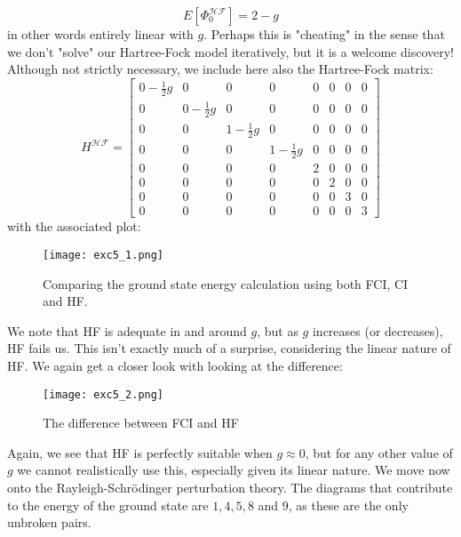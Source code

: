 \documentclass{article}
\begin{document}
\begin{equation}
    E[\Phi_0^{\mathcal{H}\mathcal{F}}] = 2 - g
\end{equation}
in other words entirely linear with $g$. Perhaps this is "cheating" in the sense that we don't "solve" our Hartree-Fock model iteratively, but it is a welcome discovery!
\newline
Although not strictly necessary, we include here also the Hartree-Fock matrix:
\begin{equation*}
H^{\mathcal{H}\mathcal{F}} =
    \begin{bmatrix}
        0 - \frac{1}{2}g & 0 & 0 & 0 & 0 & 0 & 0 & 0 \\
        0 & 0 - \frac{1}{2}g & 0 & 0 & 0 & 0 & 0 & 0 \\
        0 & 0 & 1 - \frac{1}{2}g & 0 & 0 & 0 & 0 & 0 \\
        0 & 0 & 0 & 1 - \frac{1}{2}g & 0 & 0 & 0 & 0 \\
        0 & 0 & 0 & 0 & 2 & 0 & 0 & 0 \\
        0 & 0 & 0 & 0 & 0 & 2 & 0 & 0 \\
        0 & 0 & 0 & 0 & 0 & 0 & 3 & 0 \\
        0 & 0 & 0 & 0 & 0 & 0 & 0 & 3
    \end{bmatrix}
\end{equation*}
\newline
with the associated plot:
\newpage
\begin{figure}[ht!]
    \centering
    \texttt{[image: exc5\_1.png]}
    \caption{Comparing the ground state energy calculation using both FCI, CI and HF.}
    \label{fig:enter-label}
\end{figure}
We note that HF is adequate in and around $g$, but as $g$ increases (or decreases), HF fails us. This isn't exactly much of a surprise, considering the linear nature of HF.
\newline
We again get a closer look with looking at the difference:
\begin{figure}[ht!]
    \centering
    \texttt{[image: exc5\_2.png]}
    \caption{The difference between FCI and HF}
    \label{fig:enter-label}
\end{figure}
\newline
Again, we see that HF is perfectly suitable when $g\approx 0$, but for any other value of $g$ we cannot realistically use this, especially given its linear nature.\newpage
We move now onto the Rayleigh-Schrödinger perturbation theory. The diagrams that contribute to the energy of the ground state are $1, 4, 5, 8 $ and $9$, as these are the only unbroken pairs. \newline
\end{document}
